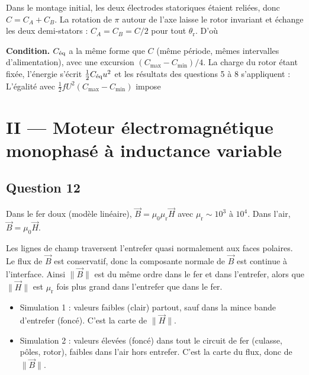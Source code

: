 \documentclass[11pt,a4paper]{article}
\providecommand{\tightlist}{\setlength{\itemsep}{0pt}\setlength{\parskip}{0pt}}
\newcommand{\equationajustee}[1]{%
  \sbox{\boiteequation}{$\displaystyle #1$}%
  \ifdim\wd\boiteequation>\linewidth
    \[\resizebox{\linewidth}{!}{\usebox{\boiteequation}}\]%
  \else
    \[#1\]%
  \fi}
\begin{document}
Dans le montage initial, les deux électrodes statoriques étaient reliées, donc \(C=C_A+C_B\). La rotation de \(\pi\) autour de l'axe laisse le rotor invariant et échange les deux demi-stators : \(C_A=C_B=C/2\) pour tout \(\theta_{\mathrm r}\). D'où
\equationajustee{\begin{aligned}
C_{\text{\text{éq}}}&=\frac{C_AC_B}{C_A+C_B}\\
&=\boxed{\frac{C(\theta_{\mathrm r})}{4}}
\end{aligned}}

\textbf{Condition.} \(C_{\text{\text{éq}}}\) a la même forme que \(C\) (même période, mêmes intervalles d'alimentation), avec une excursion \((C_{\max}-C_{\min})/4\). La charge du rotor étant fixée, l'énergie s'écrit \(\tfrac12C_{\text{\text{éq}}}u^2\) et les résultats des questions 5 à 8 s'appliquent :
\equationajustee{\langle\mathcal P'\rangle=\frac12fU'^2\,\frac{C_{\max}-C_{\min}}{4}}
L'égalité avec \(\tfrac12fU^2(C_{\max}-C_{\min})\) impose
\equationajustee{\boxed{U'=2U}}

\hypertarget{ii-moteur-uxe9lectromagnuxe9tique-monophasuxe9-uxe0-inductance-variable}{%
\section{II --- Moteur électromagnétique monophasé à inductance variable}\label{ii-moteur-uxe9lectromagnuxe9tique-monophasuxe9-uxe0-inductance-variable}}

\hypertarget{question-12}{%
\subsection{Question 12}\label{question-12}}

Dans le fer doux (modèle linéaire), \(\vec B=\mu_0\mu_{\mathrm r}\vec H\) avec \(\mu_{\mathrm r}\sim10^{3}\) à \(10^{4}\). Dans l'air, \(\vec B=\mu_0\vec H\).

Les lignes de champ traversent l'entrefer quasi normalement aux faces polaires. Le flux de \(\vec B\) est conservatif, donc la composante normale de \(\vec B\) est continue à l'interface. Ainsi \(\|\vec B\|\) est du même ordre dans le fer et dans l'entrefer, alors que \(\|\vec H\|\) est \(\mu_{\mathrm r}\) fois plus grand dans l'entrefer que dans le fer.

\begin{itemize}
\tightlist
\item
  Simulation 1 : valeurs faibles (clair) partout, sauf dans la mince bande d'entrefer (foncé). C'est la carte de \(\|\vec H\|\).
\item
  Simulation 2 : valeurs élevées (foncé) dans tout le circuit de fer (culasse, pôles, rotor), faibles dans l'air hors entrefer. C'est la carte du flux, donc de \(\|\vec B\|\).
\end{itemize}
\end{document}
